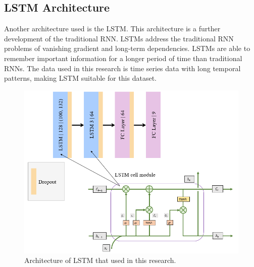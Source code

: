 \subsection{LSTM Architecture}

Another architecture used is the LSTM. This architecture is a further development of the traditional RNN. LSTMs address the traditional RNN problems of vanishing gradient and long-term dependencies. LSTMs are able to remember important information for a longer period of time than traditional RNNs. The data used in this research is time series data with long temporal patterns, making LSTM suitable for this dataset.

\begin{figure}[h!]
	\centering
	\includegraphics[width=\linewidth]{bab3/ar_LSTMArch.png}
	\caption{Architecture of LSTM that used in this research.}
	\label{fig:LSTMArch}
\end{figure}

